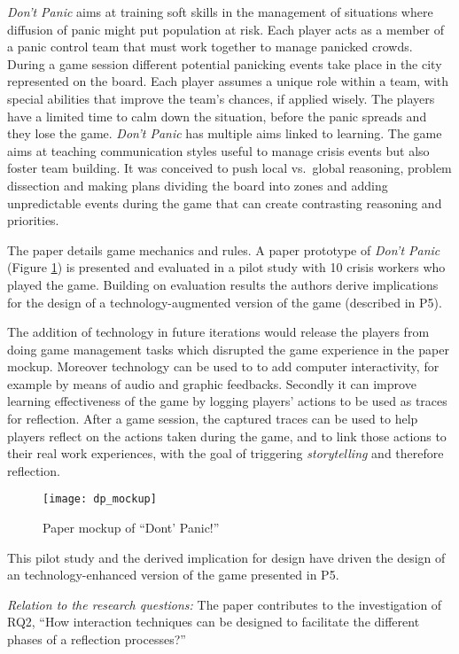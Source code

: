 \emph{Don't Panic} aims at training soft skills in the management of situations where diffusion of panic might put population at risk. Each player acts as a member of a panic control team that must work together to manage panicked crowds. During a game session different potential panicking events take place in the city represented on the board. Each player assumes a unique role within a team, with special abilities that improve the team's chances, if applied wisely. The players have a limited time to calm down the situation, before the panic spreads and they lose the game. \emph{Don't Panic} has multiple aims linked to learning. The game aims at teaching communication styles useful to manage crisis events but also foster team building. It was conceived to push local vs.~global reasoning, problem dissection and making plans dividing the board into zones and adding unpredictable events during the game that can create contrasting reasoning and priorities.

The paper details game mechanics and rules. A paper prototype of \emph{Don't Panic} (Figure \ref{fig:dp-mockup}) is presented and evaluated in a pilot study with 10 crisis workers who played the game. Building on evaluation results the authors derive implications for the design of a technology-augmented version of the game (described in P5).

The addition of technology in future iterations would release the players from doing game management tasks which disrupted the game experience in the paper mockup. Moreover technology can be used to to add computer interactivity, for example by means of audio and graphic feedbacks. Secondly it can improve learning effectiveness of the game by logging players' actions to be used as traces for reflection. After a game session, the captured traces can be used to help players reflect on the actions taken during the game, and to link those actions to their real work experiences, with the goal of triggering \emph{storytelling} and therefore reflection.
\begin{figure}
	[tbh] \centering 
	\texttt{[image: dp\_mockup]} \caption{Paper mockup of “Dont’ Panic!”} \label{fig:dp-mockup} 
\end{figure}

This pilot study and the derived implication for design have driven the design of an technology-enhanced version of the game presented in P5.

\emph{Relation to the research questions: } The paper contributes to the investigation of RQ2, ``How interaction techniques can be designed to facilitate the different phases of a reflection processes?''

